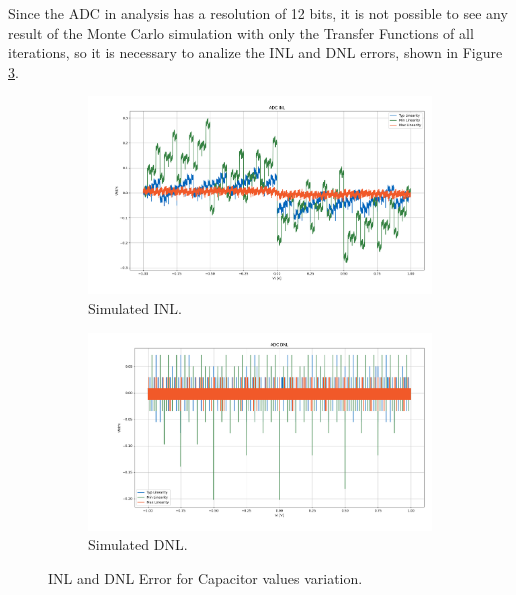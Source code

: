 Since the ADC in analysis has a resolution of 12 bits, it is not possible to see any result of the Monte Carlo simulation with only the Transfer Functions of all iterations, so it is necessary to analize the INL and DNL errors, shown in Figure \ref{fig:NL_ALLCAPS}.

\begin{figure}[H]
    \centering
    \begin{subfigure}[b]{0.8\textwidth}
        \centering
        \includegraphics[width=\textwidth]{Images/INL_All_Caps_20Ksim_s0011.png}
        \caption{Simulated INL.}
        \label{fig:INL_ALLCAPS}
    \end{subfigure}%
    
    \begin{subfigure}[b]{0.8\textwidth}
        \centering
        \includegraphics[width=\textwidth]{Images/DNL_All_Caps_20Ksim_s0011.png}
        \caption{Simulated DNL.}
        \label{fig:DNL_ALLCAPS}
    \end{subfigure}
    \caption{INL and DNL Error for Capacitor values variation.}
    \label{fig:NL_ALLCAPS}
\end{figure}

